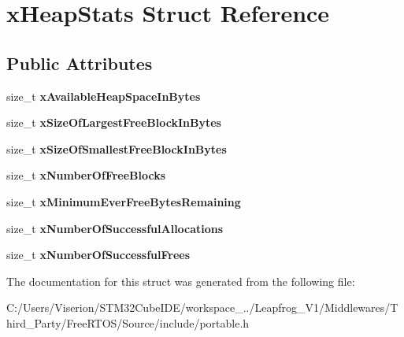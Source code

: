 \hypertarget{structx_heap_stats}{}\section{x\+Heap\+Stats Struct Reference}
\label{structx_heap_stats}
\subsection*{Public Attributes}
\begin{DoxyCompactItemize}
\item 
\mbox{\label{structx_heap_stats_a7641b3a1494c093b3fe92a511419e36f}} 
size\+\_\+t {\bfseries x\+Available\+Heap\+Space\+In\+Bytes}
\item 
\mbox{\label{structx_heap_stats_aaaf136c838775162f7f9d8218ee0ba06}} 
size\+\_\+t {\bfseries x\+Size\+Of\+Largest\+Free\+Block\+In\+Bytes}
\item 
\mbox{\label{structx_heap_stats_af881dc708d82b808ad78fce2cc318af7}} 
size\+\_\+t {\bfseries x\+Size\+Of\+Smallest\+Free\+Block\+In\+Bytes}
\item 
\mbox{\label{structx_heap_stats_af66da4ca5a39e1ae32edca5896e056ce}} 
size\+\_\+t {\bfseries x\+Number\+Of\+Free\+Blocks}
\item 
\mbox{\label{structx_heap_stats_a2ef01d960466f5cba4d61c61723118e7}} 
size\+\_\+t {\bfseries x\+Minimum\+Ever\+Free\+Bytes\+Remaining}
\item 
\mbox{\label{structx_heap_stats_a0474041a978f26b0ac0e721689a7c8db}} 
size\+\_\+t {\bfseries x\+Number\+Of\+Successful\+Allocations}
\item 
\mbox{\label{structx_heap_stats_a2a11579b572a1bd744b22f418b00279d}} 
size\+\_\+t {\bfseries x\+Number\+Of\+Successful\+Frees}
\end{DoxyCompactItemize}


The documentation for this struct was generated from the following file\+:\begin{DoxyCompactItemize}
\item 
C\+:/\+Users/\+Viserion/\+S\+T\+M32\+Cube\+I\+D\+E/workspace\+\_../\+Leapfrog\+\_\+\+V1/\+Middlewares/\+Third\+\_\+\+Party/\+Free\+R\+T\+O\+S/\+Source/include/portable.\+h\end{DoxyCompactItemize}

